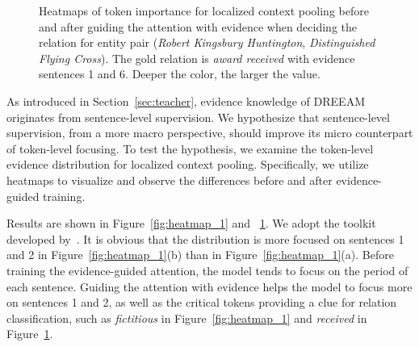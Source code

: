 \documentclass[11pt]{article}
\begin{document}
\begin{figure}[t!]
    \centering
\caption{Heatmaps of token importance for localized context pooling before and after guiding the attention with evidence when deciding the relation for entity pair (\textit{Robert Kingsbury Huntington}, \textit{Distinguished Flying Cross}). The gold relation is \textit{award received} with evidence sentences 1 and 6. Deeper the color, the larger the value. }
    \label{fig:heatmap_2}
\end{figure}

As introduced in Section~\ref{sec:teacher}, evidence knowledge of DREEAM originates from sentence-level supervision.
We hypothesize that sentence-level supervision, from a more macro perspective, should improve its micro counterpart of token-level focusing.
To test the hypothesis, we examine the token-level evidence distribution for localized context pooling.
Specifically, we utilize heatmaps to visualize  and observe the differences before and after evidence-guided training.

Results are shown in Figure~\ref{fig:heatmap_1} and ~\ref{fig:heatmap_2}. 
We adopt the toolkit developed by~\citet{yang-zhang-2018-ncrf}.
It is obvious that the distribution is more focused on sentences 1 and 2 in Figure~\ref{fig:heatmap_1}(b) than in Figure~\ref{fig:heatmap_1}(a).
Before training the evidence-guided attention, the model tends to focus on the period of each sentence.
Guiding the attention with evidence helps the model to focus more on sentences 1 and 2, as well as the critical tokens providing a clue for relation classification, such as \textit{fictitious} in Figure~\ref{fig:heatmap_1} and \textit{received} in Figure~\ref{fig:heatmap_2}.
\end{document}
